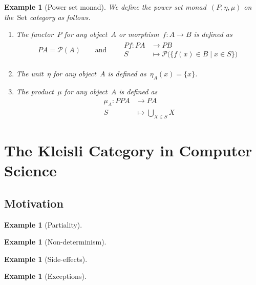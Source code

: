 \documentclass[a4paper]{article}
\theoremstyle{plain}
\newtheorem{example}[theorem]{Example}
\theoremstyle{definition}
\newcommand{\Set}{\mathrm{Set}}
\begin{document}
\begin{example}[Power set monad]
    \label{monad:power-set}
    We define the power set monad~\((P,\eta,\mu)\) on the~\(\Set\) category as
    follows.
    \begin{enumerate}
        \item The functor~\(P\) for any object~\(A\) or
            morphism~\(f:A\longrightarrow B\) is defined as
            \begin{gather*}
                PA = \mathcal{P}(A)
                \qquad\text{and}\qquad
                \begin{split}
                    Pf:PA&\longrightarrow PB \\
                    S&\longmapsto\mathcal{P}\bigl(\{f(x)\in B \mid x\in S\}\bigr)
                \end{split}
            \end{gather*}
        \item The unit~\(\eta\) for any object~\(A\) is defined
            as~\(\eta_{A}(x)=\{x\}\).
        \item The product~\(\mu\) for any object~\(A\) is defined as
            \begin{align*}
                \mu_{A}:PPA&\longrightarrow PA \\
                S&\longmapsto \bigcup_{X\in S}X
            \end{align*}
    \end{enumerate}
\end{example}

\section{The Kleisli Category in Computer Science}
\subsection{Motivation}
\begin{example}[Partiality]
\end{example}
\begin{example}[Non-determinism]
\end{example}
\begin{example}[Side-effects]
\end{example}
\begin{example}[Exceptions]
\end{example}
\end{document}
